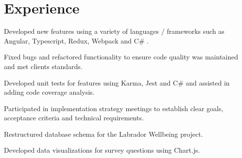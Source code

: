 \documentclass[]{chris_katsaras_resume}
\begin{document}
%



%
%

\hfill
\begin{minipage}[t]{1\textwidth} 


\section{Experience}

\vspace{\topsep}
\begin{tightemize}\item Developed new features using a variety of languages / frameworks such as Angular, Typescript, Redux, Webpack and C\# .
\item Fixed bugs and refactored functionality to ensure code quality was maintained and met clients standards. 
\item Developed unit tests for features using Karma, Jest and C\# and assisted in adding code coverage analysis. 
\item Participated in implementation strategy meetings to establish clear goals, acceptance criteria and technical requirements.

\end{tightemize}
\sectionsep

\begin{tightemize}
\item Restructured database schema for the Labrador Wellbeing project.\item Developed data visualizations for survey questions using Chart.js.\end{tightemize}
\sectionsep

 

\end{minipage}
\end{document}
